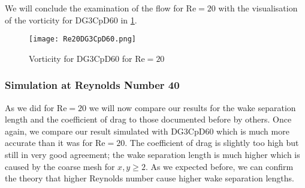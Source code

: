 We will conclude the examination of the flow for $\text{Re} = 20$ with the visualisation of the vorticity for DG3CpD60  in \cref{fig:vorticity20}.
	
\begin{figure}[htp]
	\centering
	\texttt{[image: Re20DG3CpD60.png]}
	\caption{Vorticity for DG3CpD60 for $\text{Re} = 20$}
	\label{fig:vorticity20}
\end{figure}	

	\subsubsection{Simulation at Reynolds Number 40}
	As we did for $\text{Re}=20$ we will now compare our results for the wake separation length and the coefficient of drag to those documented before by others. Once again, we compare our result simulated with DG3CpD60 which is much more accurate than it was for $\text{Re}=20$. The coefficient of drag is slightly too high but still in very good agreement; the wake separation length is much higher which is caused by the coarse mesh for $x,y \geq 2$. As we expected before, we can confirm the theory that higher Reynolds number cause higher wake separation lengths.
